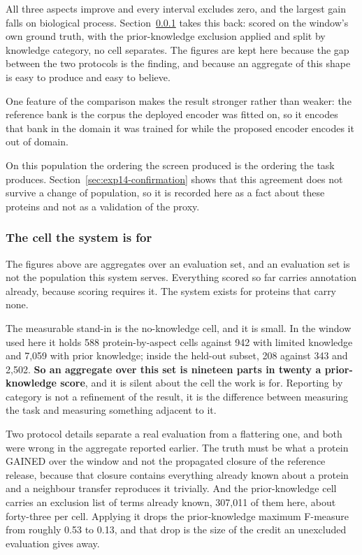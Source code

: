 All three aspects improve and every interval excludes zero, and the largest gain falls
on biological process. Section~\ref{sec:exp14-category} takes this back: scored on the
window's own ground truth, with the prior-knowledge exclusion applied and split by
knowledge category, no cell separates. The figures are kept here because the gap
between the two protocols is the finding, and because an aggregate of this shape is
easy to produce and easy to believe.

One feature of the comparison makes the result stronger rather than weaker: the
reference bank is the corpus the deployed encoder was fitted on, so it encodes that
bank in the domain it was trained for while the proposed encoder encodes it out of
domain.

On this population the ordering the screen produced is the ordering the task
produces. Section~\ref{sec:exp14-confirmation} shows that this agreement does not
survive a change of population, so it is recorded here as a fact about these
proteins and not as a validation of the proxy.

\subsubsection{The cell the system is for}
\label{sec:exp14-category}

The figures above are aggregates over an evaluation set, and an evaluation set is not
the population this system serves. Everything scored so far carries annotation
already, because scoring requires it. The system exists for proteins that carry none.

The measurable stand-in is the no-knowledge cell, and it is small. In the window used
here it holds 588 protein-by-aspect cells against 942 with limited knowledge and 7,059
with prior knowledge; inside the held-out subset, 208 against 343 and 2,502. \textbf{So an
aggregate over this set is nineteen parts in twenty a prior-knowledge score}, and it
is silent about the cell the work is for. Reporting by category is not a refinement of
the result, it is the difference between measuring the task and measuring something
adjacent to it.

Two protocol details separate a real evaluation from a flattering one, and both were
wrong in the aggregate reported earlier. The truth must be what a protein GAINED over
the window and not the propagated closure of the reference release, because that
closure contains everything already known about a protein and a neighbour transfer
reproduces it trivially. And the prior-knowledge cell carries an exclusion list of
terms already known, 307,011 of them here, about forty-three per cell. Applying it
drops the prior-knowledge maximum F-measure from roughly 0.53 to 0.13, and that drop
is the size of the credit an unexcluded evaluation gives away.

